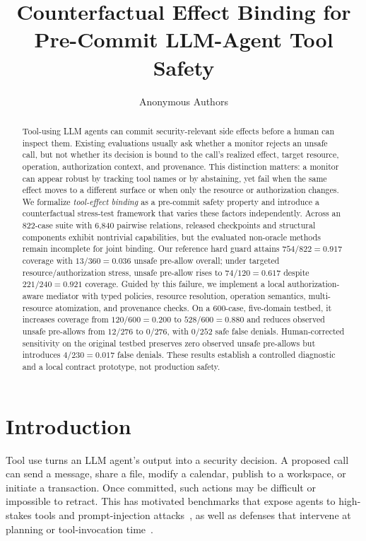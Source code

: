 \documentclass[10pt,twocolumn]{article}
\title{Counterfactual Effect Binding for Pre-Commit LLM-Agent Tool Safety}
\author{Anonymous Authors}
\date{}
\begin{document}
\maketitle

\begin{abstract}
Tool-using LLM agents can commit security-relevant side effects before a human can inspect them. Existing evaluations usually ask whether a monitor rejects an unsafe call, but not whether its decision is bound to the call's realized effect, target resource, operation, authorization context, and provenance. This distinction matters: a monitor can appear robust by tracking tool names or by abstaining, yet fail when the same effect moves to a different surface or when only the resource or authorization changes. We formalize \emph{tool-effect binding} as a pre-commit safety property and introduce a counterfactual stress-test framework that varies these factors independently. Across an 822-case suite with 6,840 pairwise relations, released checkpoints and structural components exhibit nontrivial capabilities, but the evaluated non-oracle methods remain incomplete for joint binding. Our reference hard guard attains $754/822=0.917$ coverage with $13/360=0.036$ unsafe pre-allow overall; under targeted resource/authorization stress, unsafe pre-allow rises to $74/120=0.617$ despite $221/240=0.921$ coverage. Guided by this failure, we implement a local authorization-aware mediator with typed policies, resource resolution, operation semantics, multi-resource atomization, and provenance checks. On a 600-case, five-domain testbed, it increases coverage from $120/600=0.200$ to $528/600=0.880$ and reduces observed unsafe pre-allows from $12/276$ to $0/276$, with $0/252$ safe false denials. Human-corrected sensitivity on the original testbed preserves zero observed unsafe pre-allows but introduces $4/230=0.017$ false denials. These results establish a controlled diagnostic and a local contract prototype, not production safety.
\end{abstract}

\section{Introduction}

Tool use turns an LLM agent's output into a security decision. A proposed call can send a message, share a file, modify a calendar, publish to a workspace, or initiate a transaction. Once committed, such actions may be difficult or impossible to retract. This has motivated benchmarks that expose agents to high-stakes tools and prompt-injection attacks~\cite{toolemu,agentdojo}, as well as defenses that intervene at planning or tool-invocation time~\cite{toolsafe,safiron}.
\end{document}
